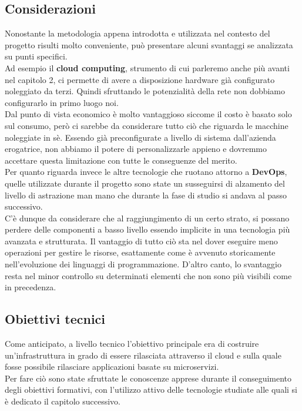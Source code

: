 \documentclass[a4paper,12pt]{report}
\begin{document}
\subsection{Considerazioni}
Nonostante la metodologia appena introdotta e utilizzata nel contesto del progetto risulti molto conveniente, può presentare alcuni svantaggi se analizzata su punti specifici.\\
Ad esempio il \textbf{cloud computing}, strumento di cui parleremo anche più avanti nel capitolo 2, ci permette di avere a disposizione hardware già configurato noleggiato da terzi. Quindi sfruttando le potenzialità della rete non dobbiamo configurarlo in primo luogo noi.\cite{cloud}\\ Dal punto di vista economico è molto vantaggioso siccome il costo è basato solo sul consumo, però ci sarebbe da considerare tutto ciò che riguarda le macchine noleggiate in sè. Essendo già preconfigurate a livello di sistema dall'azienda erogatrice, non abbiamo il potere di personalizzarle appieno e dovremmo accettare questa limitazione con tutte le conseguenze del merito.\\
Per quanto riguarda invece le altre tecnologie che ruotano attorno a \textbf{DevOps}, quelle utilizzate durante il progetto sono state un susseguirsi di alzamento del livello di astrazione man mano che durante la fase di studio si andava al passo successivo.\\
C'è dunque da considerare che al raggiungimento di un certo strato, si possano perdere delle componenti a basso livello essendo implicite in una tecnologia più avanzata e strutturata. Il vantaggio di tutto ciò sta nel dover eseguire meno operazioni per gestire le risorse, esattamente come è avvenuto storicamente nell'evoluzione dei linguaggi di programmazione. D'altro canto, lo svantaggio resta nel minor controllo su determinati elementi che non sono più visibili come in precedenza.


\subsection{Obiettivi tecnici}
Come anticipato, a livello tecnico l'obiettivo principale era di costruire un'infrastruttura in grado di essere rilasciata attraverso il cloud e sulla quale fosse possibile rilasciare applicazioni basate su microservizi.\\
Per fare ciò sono state sfruttate le conoscenze apprese durante il conseguimento degli obiettivi formativi, con l'utilizzo attivo delle tecnologie studiate alle quali si è dedicato il capitolo successivo.
\end{document}
